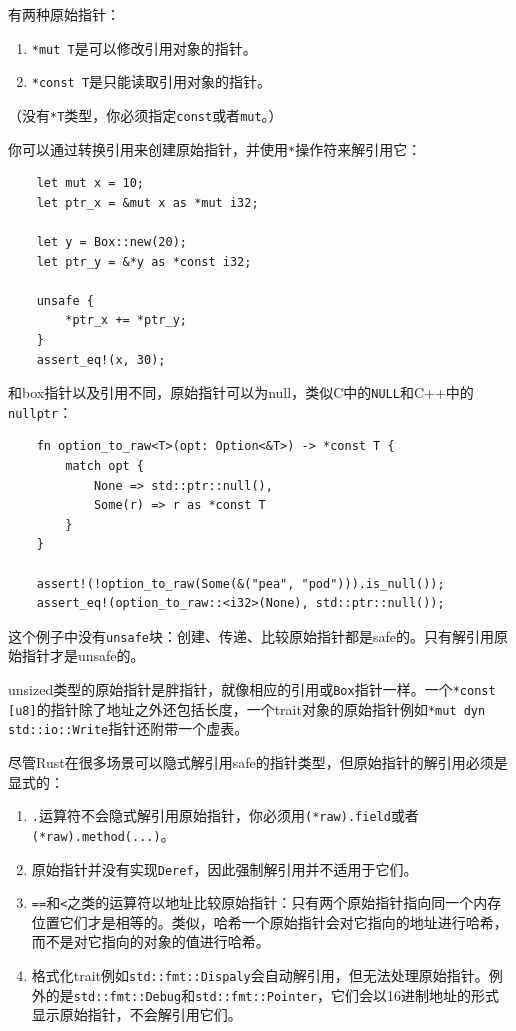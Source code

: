 有两种原始指针：
\begin{enumerate}
    \item \texttt{*mut T}是可以修改引用对象的指针。
    \item \texttt{*const T}是只能读取引用对象的指针。
\end{enumerate}
（没有\texttt{*T}类型，你必须指定\texttt{const}或者\texttt{mut}。）

你可以通过转换引用来创建原始指针，并使用\texttt{*}操作符来解引用它：
\begin{verbatim}
    let mut x = 10;
    let ptr_x = &mut x as *mut i32;

    let y = Box::new(20);
    let ptr_y = &*y as *const i32;

    unsafe {
        *ptr_x += *ptr_y;
    }
    assert_eq!(x, 30);
\end{verbatim}

和box指针以及引用不同，原始指针可以为null，类似C中的\texttt{NULL}和C++中的\texttt{nullptr}：
\begin{verbatim}
    fn option_to_raw<T>(opt: Option<&T>) -> *const T {
        match opt {
            None => std::ptr::null(),
            Some(r) => r as *const T
        }
    }

    assert!(!option_to_raw(Some(&("pea", "pod"))).is_null());
    assert_eq!(option_to_raw::<i32>(None), std::ptr::null());
\end{verbatim}

这个例子中没有\texttt{unsafe}块：创建、传递、比较原始指针都是safe的。只有解引用原始指针才是unsafe的。

unsized类型的原始指针是胖指针，就像相应的引用或\texttt{Box}指针一样。一个\texttt{*const [u8]}的指针除了地址之外还包括长度，一个trait对象的原始指针例如\texttt{*mut dyn std::io::Write}指针还附带一个虚表。

尽管Rust在很多场景可以隐式解引用safe的指针类型，但原始指针的解引用必须是显式的：
\begin{enumerate}
    \item \texttt{.}运算符不会隐式解引用原始指针，你必须用\texttt{(*raw).field}或者\texttt{(*raw).method(...)}。
    \item 原始指针并没有实现\texttt{Deref}，因此强制解引用并不适用于它们。
    \item \texttt{==}和\texttt{<}之类的运算符以地址比较原始指针：只有两个原始指针指向同一个内存位置它们才是相等的。类似，哈希一个原始指针会对它指向的地址进行哈希，而不是对它指向的对象的值进行哈希。
    \item 格式化trait例如\texttt{std::fmt::Dispaly}会自动解引用，但无法处理原始指针。例外的是\texttt{std::fmt::Debug}和\texttt{std::fmt::Pointer}，它们会以16进制地址的形式显示原始指针，不会解引用它们。
\end{enumerate}

